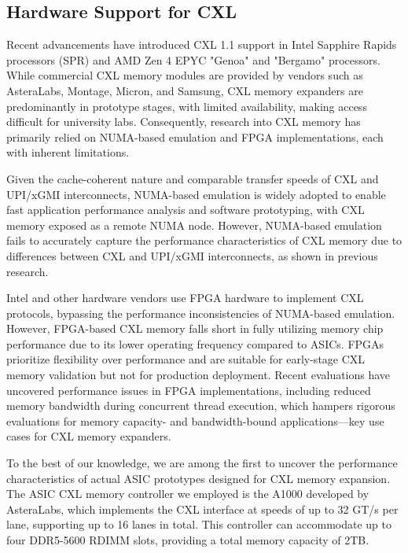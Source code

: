\subsection{Hardware Support for CXL} \label{ssec
}

Recent advancements have introduced CXL 1.1 support in Intel Sapphire Rapids processors (SPR) and AMD Zen 4 EPYC "Genoa" and "Bergamo" processors. While commercial CXL memory modules are provided by vendors such as AsteraLabs, Montage, Micron, and Samsung, CXL memory expanders are predominantly in prototype stages, with limited availability, making access difficult for university labs. Consequently, research into CXL memory has primarily relied on NUMA-based emulation and FPGA implementations, each with inherent limitations.

 Given the cache-coherent nature and comparable transfer speeds of CXL and UPI/xGMI interconnects, NUMA-based emulation is widely adopted to enable fast application performance analysis and software prototyping, with CXL memory exposed as a remote NUMA node. However, NUMA-based emulation fails to accurately capture the performance characteristics of CXL memory due to differences between CXL and UPI/xGMI interconnects, as shown in previous research.

 Intel and other hardware vendors use FPGA hardware to implement CXL protocols, bypassing the performance inconsistencies of NUMA-based emulation. However, FPGA-based CXL memory falls short in fully utilizing memory chip performance due to its lower operating frequency compared to ASICs. FPGAs prioritize flexibility over performance and are suitable for early-stage CXL memory validation but not for production deployment. Recent evaluations have uncovered performance issues in FPGA implementations, including reduced memory bandwidth during concurrent thread execution, which hampers rigorous evaluations for memory capacity- and bandwidth-bound applications—key use cases for CXL memory expanders.

To the best of our knowledge, we are among the first to uncover the performance characteristics of actual ASIC prototypes designed for CXL memory expansion. The ASIC CXL memory controller we employed is the A1000 developed by AsteraLabs, which implements the CXL interface at speeds of up to 32 GT/s per lane, supporting up to 16 lanes in total. This controller can accommodate up to four DDR5-5600 RDIMM slots, providing a total memory capacity of 2TB.

